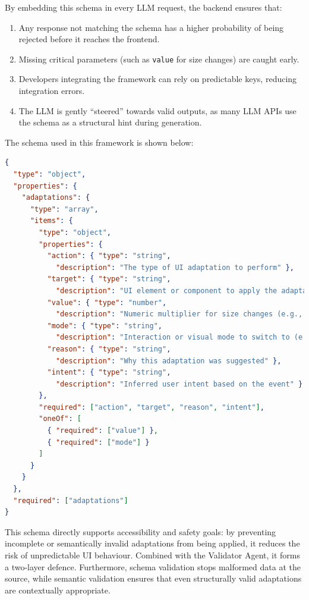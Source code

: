 \documentclass[openany]{book}
\begin{document}
By embedding this schema in every LLM request, the backend ensures that:
\begin{enumerate}
    \item Any response not matching the schema has a higher probability of being rejected before it reaches the frontend.
    \item Missing critical parameters (such as \texttt{value} for size changes) are caught early.
    \item Developers integrating the framework can rely on predictable keys, reducing integration errors.
    \item The LLM is gently “steered” towards valid outputs, as many LLM APIs use the schema as a structural hint during generation.
\end{enumerate}

The schema used in this framework is shown below:

\begin{lstlisting}[language=json,caption={SIF LLM Output JSON Schema}]
{
  "type": "object",
  "properties": {
    "adaptations": {
      "type": "array",
      "items": {
        "type": "object",
        "properties": {
          "action": { "type": "string",
            "description": "The type of UI adaptation to perform" },
          "target": { "type": "string",
            "description": "UI element or component to apply the adaptation to, 'all' is allowed" },
          "value": { "type": "number",
            "description": "Numeric multiplier for size changes (e.g., 1.5 for 50% larger)" },
          "mode": { "type": "string",
            "description": "Interaction or visual mode to switch to (e.g., 'voice')" },
          "reason": { "type": "string",
            "description": "Why this adaptation was suggested" },
          "intent": { "type": "string",
            "description": "Inferred user intent based on the event" }
        },
        "required": ["action", "target", "reason", "intent"],
        "oneOf": [
          { "required": ["value"] },
          { "required": ["mode"] }
        ]
      }
    }
  },
  "required": ["adaptations"]
}
\end{lstlisting}

This schema directly supports accessibility and safety goals: by preventing incomplete or semantically invalid adaptations from being applied, it reduces the risk of unpredictable UI behaviour. Combined with the Validator Agent, it forms a two-layer defence. Furthermore, schema validation stops malformed data at the source, while semantic validation ensures that even structurally valid adaptations are contextually appropriate.
\end{document}
